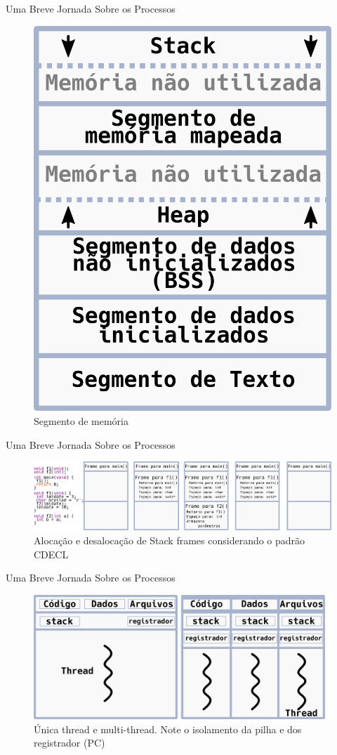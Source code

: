 \documentclass[xcolor={usenames,svgnames,dvipsnames},brazil,english,12pt,aspectratio=149]{beamer}
\begin{document}
\begin{frame}{Uma Breve Jornada Sobre os Processos}
	\begin{figure}[!h]
		\centering
		\includegraphics[width=.4\textwidth]{memory_segment} 
		\caption{Segmento de memória\label{fig:memory_segment}}
	\end{figure}
\end{frame}

\begin{frame}{Uma Breve Jornada Sobre os Processos}
	\begin{figure}[!h]
		\centering
		\includegraphics[width=\textwidth]{stack_frame}
		\caption{Alocação e desalocação de Stack frames considerando o padrão CDECL\label{fig:stack_frames}}
	\end{figure}
\end{frame}

\begin{frame}{Uma Breve Jornada Sobre os Processos}
	\begin{figure}[!h]
		\centering
		\includegraphics[width=.7\textwidth]{process_and_threads}
		\caption{Única thread e multi-thread. Note o isolamento da pilha e dos registrador (PC)\label{fig:single_thread_multi_thread}}
	\end{figure}
\end{frame}
\end{document}
